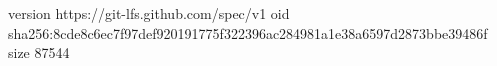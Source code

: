 version https://git-lfs.github.com/spec/v1
oid sha256:8cde8c6ec7f97def920191775f322396ac284981a1e38a6597d2873bbe39486f
size 87544
